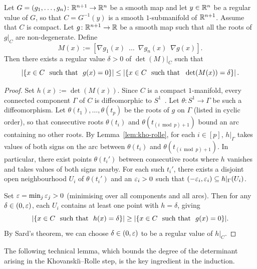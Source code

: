 \begin{corollary} \label{cor:kho-rolle} Let $G = (g_1, \ldots, g_n)\colon \mathbb{R}^{n+1} \rightarrow \mathbb{R}^{n}$ be a smooth map and let $y \in \mathbb{R}^n$ be a regular value of $G$, so that $C = G^{-1}(y)$ is a smooth $1$-submanifold of $\mathbb{R}^{n+1}$. Assume that $C$ is compact. Let $g\colon \mathbb{R}^{n+1} \rightarrow \mathbb{R}$ be a smooth map such that all the roots of $g|_C$ are non-degenerate. Define
\begin{equation*}
  M(x) := \left[\nabla g_1(x)\enspace \ldots\enspace \nabla g_n(x)\enspace \nabla g(x)\right].
\end{equation*}
Then there exists a regular value $\delta > 0$ of $\det(M)|_C$ such that
\begin{equation*}
  \left|\left\{x \in C \ \text{ such that }\  g(x) = 0\right\}\right| \le \left|\left\{x \in C \ \text{ such that }\  \det(M(x)) = \delta\right\}\right|.
\end{equation*}
\end{corollary}

\begin{proof}
Set $h(x) := \det\left(M(x)\right)$. Since $C$ is a compact $1$-manifold, every connected component $\Gamma$ of $C$ is diffeomorphic to $S^1$~\cite[Appendix]{milnor1997topology}. Let $\theta\colon S^1 \rightarrow \Gamma$ be such a diffeomorphism. Let $\theta(t_1), \ldots, \theta(t_p)$ be the roots of $g$ on $\Gamma$ (listed in cyclic order), so that consecutive roots $\theta(t_i)$ and $\theta(t_{(i\bmod p)+1})$ bound an arc containing no other roots. By Lemma~\ref{lem:kho-rolle}, for each $i\in [p]$, $h|_\Gamma$ takes values of both signs on the arc between $\theta(t_i)$ and $\theta(t_{(i\bmod p)+1})$. In particular, there exist points $\theta(t_i')$ between consecutive roots where $h$ vanishes and takes values of both signs nearby. For each such $t_i'$, there exists a disjoint open neighbourhood $U_i$ of $\theta(t_i')$ and an $\varepsilon_i > 0$ such that $(-\varepsilon_i, \varepsilon_i) \subseteq h|_\Gamma(U_i)$.

Set $\varepsilon = \min_j \varepsilon_j > 0$ (minimising over all components and all arcs). Then for any $\delta \in (0, \varepsilon)$, each $U_i$ contains at least one point with $h = \delta$, giving 
\begin{equation*}
  |\{x\in C \ \text{ such that }\  h(x) = \delta\}| \geq |\{x\in C \ \text{ such that }\  g(x) = 0\}|.
\end{equation*} 
By Sard's theorem, we can choose $\delta \in (0, \varepsilon)$ to be a regular value of $h|_C$.
\end{proof}

The following technical lemma, which bounds the degree of the determinant arising in the Khovanski{\u\i}--Rolle step, is the key ingredient in the induction.

